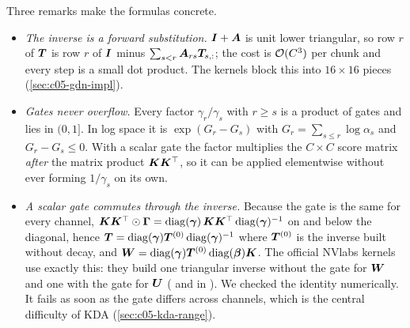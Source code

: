 Three remarks make the formulas concrete.
\begin{itemize}
  \item \emph{The inverse is a forward substitution.} $\bm{I} + \bm{A}$ is unit lower triangular, so
  row $r$ of $\bm{T}$ is row $r$ of $\bm{I}$ minus $\sum_{s<r}\bm{A}_{rs}\bm{T}_{s,:}$; the cost is $\mathcal{O}(C^3)$ per chunk
  and every step is a small dot product. The kernels block this into $16\times16$ pieces
  (\cref{sec:c05-gdn-impl}).
  \item \emph{Gates never overflow.} Every factor $\gamma_r/\gamma_s$ with $r\ge s$ is a product of
  gates and lies in $(0,1]$. In log space it is $\exp(G_r - G_s)$ with $G_r = \sum_{s\le r}\log\alpha_s$
  and $G_r - G_s \le 0$. With a scalar gate the factor multiplies the $C\times C$ score matrix
  \emph{after} the matrix product $\bm{K}\bm{K}^{\top}$, so it can be applied elementwise without ever forming
  $1/\gamma_s$ on its own.
  \item \emph{A scalar gate commutes through the inverse.} Because the gate is the same for every
  channel, $\bm{K}\bm{K}^{\top}\odot\bm\Gamma = \operatorname{diag}(\bm\gamma)\,\bm{K}\bm{K}^{\top}\operatorname{diag}(\bm\gamma)^{-1}$ on and below
  the diagonal, hence $\bm{T} = \operatorname{diag}(\bm\gamma)\bm{T}^{(0)}\operatorname{diag}(\bm\gamma)^{-1}$ where $\bm{T}^{(0)}$ is
  the inverse built without decay, and $\bm{W} = \operatorname{diag}(\bm\gamma)\bm{T}^{(0)}\operatorname{diag}(\bm{\beta})\bm{K}$. The
  official NVlabs kernels use exactly this: they build one triangular inverse without the gate for
  $\bm{W}$ and one with the gate for $\bm{U}$ ( and
   in ).
  We checked the identity numerically. It fails as soon as the gate differs across channels, which
  is the central difficulty of KDA (\cref{sec:c05-kda-range}).
\end{itemize}

